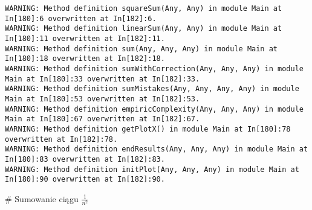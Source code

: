 \documentclass[11pt]{article}
\begin{document}
    \begin{Verbatim}[commandchars=\\\{\}]
WARNING: Method definition squareSum(Any, Any) in module Main at In[180]:6 overwritten at In[182]:6.
WARNING: Method definition linearSum(Any, Any) in module Main at In[180]:11 overwritten at In[182]:11.
WARNING: Method definition sum(Any, Any, Any) in module Main at In[180]:18 overwritten at In[182]:18.
WARNING: Method definition sumWithCorrection(Any, Any, Any) in module Main at In[180]:33 overwritten at In[182]:33.
WARNING: Method definition sumMistakes(Any, Any, Any, Any) in module Main at In[180]:53 overwritten at In[182]:53.
WARNING: Method definition empiricComplexity(Any, Any, Any) in module Main at In[180]:67 overwritten at In[182]:67.
WARNING: Method definition getPlotX() in module Main at In[180]:78 overwritten at In[182]:78.
WARNING: Method definition endResults(Any, Any, Any) in module Main at In[180]:83 overwritten at In[182]:83.
WARNING: Method definition initPlot(Any, Any, Any) in module Main at In[180]:90 overwritten at In[182]:90.

    \end{Verbatim}

    \# Sumowanie ciągu $\frac{1}{n^2}$
\end{document}
